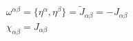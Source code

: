 \begin{equation}
 \begin{array}{l}
 \omega^{\alpha\beta}=\{\eta^\alpha,\eta^\beta\}=\tilde{J}_{\alpha\beta}=-J_{\alpha\beta}\\
 \chi_{\alpha\beta}=J_{\alpha\beta}
 \end{array}
 \label{a25}
 \end{equation}

